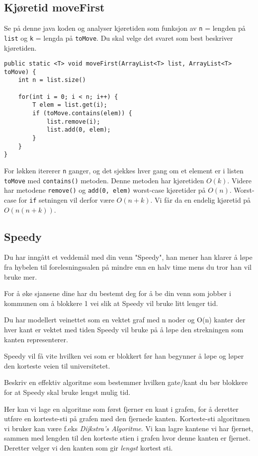 \documentclass{article}
\begin{document}
\subsection{Kjøretid moveFirst}
Se på denne java koden og analyser kjøretiden som funksjon av \texttt{n} = lengden på \texttt{list} og \texttt{k} = lengda på \texttt{toMove}. Du skal velge det svaret som best beskriver kjøretiden.

\begin{lstlisting}
public static <T> void moveFirst(ArrayList<T> list, ArrayList<T> toMove) {
    int n = list.size()

    for(int i = 0; i < n; i++) {
        T elem = list.get(i);
        if (toMove.contains(elem)) {
            list.remove(i);
            list.add(0, elem);
        }
    }
} 
\end{lstlisting}

\begin{ans}
    For løkken itererer \texttt{n} ganger, og det sjekkes hver gang om et element er i listen \texttt{toMove} med \texttt{contains()} metoden. Denne metoden har kjøretiden \( O(k) \). Videre har metodene \texttt{remove()} og \texttt{add(0, elem)} worst-case kjøretider på \( O(n) \). Worst-case for \texttt{if} setningen vil derfor være \( O\left( n + k \right) \). Vi får da en endelig kjøretid på \( O\left( n\left( n + k \right) \right) \).
\end{ans}

\subsection{Speedy}
Du har inngått et veddemål med din venn "Speedy", han mener han klarer å løpe fra hybelen til forelesningssalen på mindre enn en halv time mens du tror han vil bruke mer.
\medskip

For å øke sjansene dine har du bestemt deg for å be din venn som jobber i kommunen om å blokkere 1 vei slik at Speedy vil bruke litt lenger tid.
\medskip

Du har modellert veinettet som en vektet graf med n noder og O(n) kanter der hver kant er vektet med tiden Speedy vil bruke på å løpe den strekningen som kanten representerer.
\medskip

Speedy vil få vite hvilken vei som er blokkert før han begynner å løpe og løper den korteste veien til universitetet.
\medskip

Beskriv en effektiv algoritme som bestemmer hvilken gate/kant du bør blokkere for at Speedy skal bruke lengst mulig tid.

\begin{ans}
    Her kan vi lage en algoritme som først fjerner en kant i grafen, for å deretter utføre en korteste-sti på grafen med den fjernede kanten. Korteste-sti algoritmen vi bruker kan være f.eks \textit{Dijkstra's Algoritme}. Vi kan lagre kantene vi har fjernet, sammen med lengden til den korteste stien i grafen hvor denne kanten er fjernet. Deretter velger vi den kanten som gir \textit{lengst} kortest sti.
\end{ans}
\end{document}

